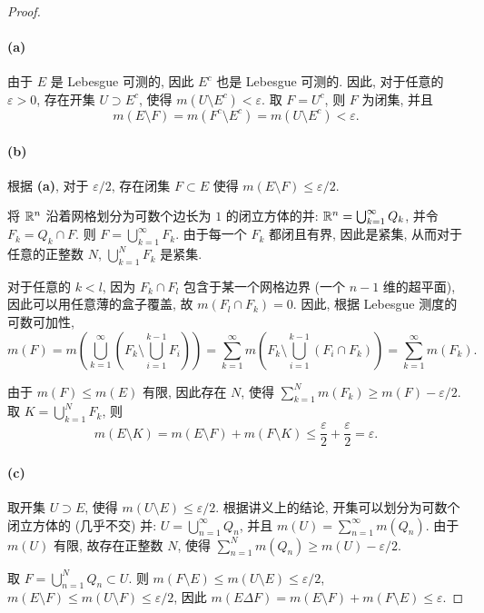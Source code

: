 \documentclass{article}
\begin{document}
\begin{proof}
	\paragraph{(a)} 由于 $E$ 是 Lebesgue 可测的, 因此 $E^c$ 也是 Lebesgue 可测的. 因此, 对于任意的 $\varepsilon>0$, 存在开集 $U \supset E^c$, 使得 $m(U \setminus E^c) < \varepsilon$. 取 $F = U^c$, 则 $F$ 为闭集, 并且
	\[ m(E \setminus F) = m(F^c \setminus E^c) = m(U \setminus E^c) < \varepsilon. \]

	\paragraph{(b)} 根据 \textbf{(a)}, 对于 $\varepsilon/2$, 存在闭集 $F \subset E$ 使得 $m(E \setminus F) \le \varepsilon/2$.

	将 $\mathbb{R}^n$ 沿着网格划分为可数个边长为 $1$ 的闭立方体的并: $\mathbb{R}^n = \bigcup_{k=1}^{\infty} Q_k$, 并令 $F_k = Q_k \cap F$. 则 $F = \bigcup_{k=1}^{\infty}F_k$. 由于每一个 $F_k$ 都闭且有界, 因此是紧集, 从而对于任意的正整数 $N$, $\bigcup_{k=1}^{N}F_k$ 是紧集.

	对于任意的 $k < l$, 因为 $F_k \cap F_l$ 包含于某一个网格边界 (一个 $n-1$ 维的超平面), 因此可以用任意薄的盒子覆盖, 故 $m(F_l \cap F_k) = 0$. 因此, 根据 Lebesgue 测度的可数可加性,
	\[ m(F) 
	= m \left( \bigcup_{k=1}^{\infty} \left( F_k \setminus \bigcup_{i=1}^{k-1} F_i \right) \right)
	= \sum_{k=1}^{\infty} m \left( F_k \setminus \bigcup_{i=1}^{k-1} (F_i \cap F_k) \right) = \sum_{k=1}^{\infty} m(F_k). \]

	由于 $m(F) \le m(E)$ 有限, 因此存在 $N$, 使得 $\sum_{k=1}^{N} m(F_k) \ge m(F) - \varepsilon/2$. 取 $K = \bigcup_{k=1}^{N} F_k$, 则
	\[ m(E \setminus K) = m(E \setminus F) + m(F \setminus K) \le \frac{\varepsilon}{2} + \frac{\varepsilon}{2} = \varepsilon. \]

	\paragraph{(c)} 取开集 $U \supset E$, 使得 $m(U \setminus E) \le \varepsilon/2$. 根据讲义上的结论, 开集可以划分为可数个闭立方体的 (几乎不交) 并: $U = \bigcup_{n=1}^{\infty} Q_n$, 并且 $m(U) = \sum_{n=1}^{\infty} m(Q_n)$. 由于 $m(U)$ 有限, 故存在正整数 $N$, 使得 $\sum_{n=1}^{N} m(Q_n) \ge m(U) - \varepsilon/2$.

	取 $F = \bigcup_{n=1}^{N}Q_n \subset U$. 则 $m(F \setminus E) \le m(U \setminus E) \le \varepsilon/2$, $m(E \setminus F) \le m(U \setminus F) \le \varepsilon/2$, 因此 $m(E \Delta F) = m(E \setminus F) + m(F \setminus E) \le \varepsilon$.
\end{proof}
\end{document}
